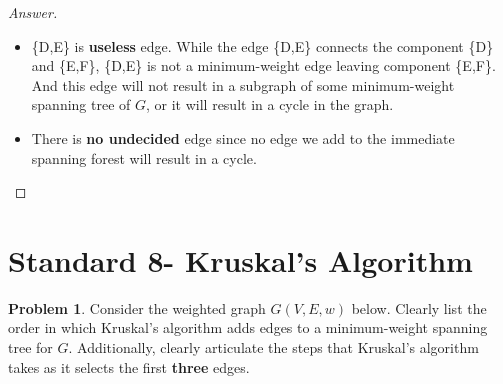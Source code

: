 \documentclass[11pt]{article}
\theoremstyle{definition}
\theoremstyle{definition}
\newtheorem{required}{Problem}
\theoremstyle{definition}
\begin{document}
\begin{proof}[Answer]
\begin{itemize}
\item \{D,E\}  is \textbf{useless} edge. While the edge \{D,E\} connects the component \{D\} and \{E,F\}, \{D,E\} is not a minimum-weight edge leaving component \{E,F\}. And this edge will not result in a subgraph of some minimum-weight spanning tree of $G$, or it will result in a cycle in the graph.

\item There is \textbf{no undecided} edge since no edge we add to the immediate spanning forest will result in a cycle. 
\end{itemize}
\end{proof}

 
\newpage
\section{Standard 8- Kruskal's Algorithm}

\begin{required}
Consider the weighted graph $G(V, E, w)$ below. Clearly list the order in which Kruskal's algorithm adds edges to a minimum-weight spanning tree for $G$. Additionally, clearly articulate the steps that Kruskal's algorithm takes as it selects the first \textbf{three} edges.

\begin{center}
\end{center}
\end{required}
\end{document}
